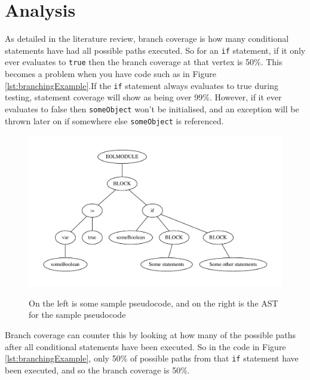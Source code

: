 \section{Analysis}

As detailed in the literature review, branch coverage is how many conditional statements have had all possible paths executed. So for an \verb|if| statement, if it only ever evaluates to \verb|true| then the branch coverage at that vertex is 50\%. This becomes a problem when you have code such as in Figure \ref{lst:branchingExample}.If the \verb|if| statement always evaluates to true during testing, statement coverage will show as being over 99\%. However, if it ever evaluates to false then \verb|someObject| won't be initialised, and an exception will be thrown later on if somewhere else \verb|someObject| is referenced.

\begin{figure}
\centering
\begin{minipage}{.33\textwidth}
  \centering
  
  \label{lst:branchingExample}
\end{minipage}%
\begin{minipage}{.5\textwidth}
  \centering
  \includegraphics[scale=0.5]{figures/branchSampleAST.pdf}
  \label{fig:branchExampleAST}
\end{minipage}
\caption{On the left is some sample pseudocode, and on the right is the AST for the sample pseudocode}
\end{figure}

Branch coverage can counter this by looking at how many of the possible paths after all conditional statements have been executed. So in the code in Figure \ref{lst:branchingExample}, only 50\% of possible paths from that \verb|if| statement have been executed, and so the branch coverage is 50\%.

